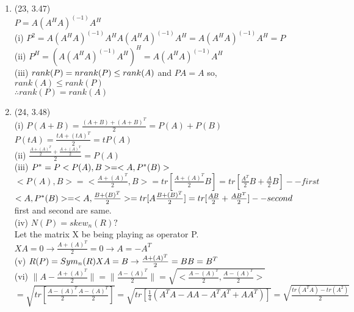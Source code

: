 \documentclass[letterpaper,12pt]{article}
\theoremstyle{definition}
\begin{document}
\begin{enumerate}
	\item (23, 3.47) \\ $ P = A(A^HA)^{(-1)}A^H$ \\
			(i) $P^2 = A(A^HA)^{(-1)}A^HA(A^HA)^{(-1)}A^H  =A(A^HA)^{(-1)}A^H = P$ \\
			(ii) $P^H = (A(A^HA)^{(-1)}A^H )^H =A(A^HA)^{(-1)}A^H $ \\
			(iii) $rank(P) = n \\ rank(P) \leq rank(A)$ and $PA=A$ so, $rank(A) \leq rank(P)$\\
				$\therefore rank(P) = rank(A)$




	\item (24, 3.48) \\ (i) $P(A+B) = \frac{(A+B)+(A+B)^T}{2}=P(A) + P(B) $\\
					  $P(tA) = \frac{tA+(tA)^T}{2} = tP(A)$\\
				(ii) $ \frac{  \frac{A+(A)^T}{2}+  \frac{A+(A)^T}{2}    }{2} =  P(A)$ \\
				(iii) $P^*=P \\ <P(A),B> = <A, P^*(B)>$ \\
					$<P(A),B> = < \frac{A+(A)^T}{2}, B> = tr[\frac{A+(A)^T}{2}B] = tr[\frac{A^T}{2}B + \frac{A}{2}B] -- first $ \\
				$<A,P^*(B)> = <A, \frac{B+(B)^T}{2}> = tr[A\frac{B+(B)^T}{2}] = tr[\frac{AB}{2} + \frac{AB^T}{2}]  -- second\\$
		first and second are same.\\
				(iv) $N(P) = skew_{n}(R) ?$ \\ Let the matrix X be being playing as operator P. \\
						$XA = 0 \rightarrow \frac{A+(A)^T}{2}=0 \rightarrow A=-A^T$ \\
				(v) $R(P) = Sym_{n}(R) \\ XA = B \rightarrow \frac{A+(A)^T}{2} = B \\ B=B^T$\\
				(vi) $\| A - \frac{A+(A)^T}{2} \| = \| \frac{A-(A)^T}{2} \| = \sqrt{<\frac{A-(A)^T}{2},\frac{A-(A)^T}{2}>}$\\
					$= \sqrt{tr[\frac{A-(A)^T}{2}\frac{A-(A)^T}{2}]}= \sqrt{tr[\frac{1}{4}(A^TA-AA-A^TA^T+AA^T)]} = \sqrt{\frac{tr(A^TA)-tr(A^2)}{2}}$





\end{enumerate}
\end{document}
